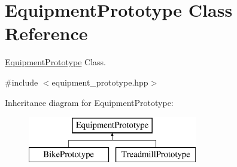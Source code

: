 \hypertarget{class_equipment_prototype}{}\section{Equipment\+Prototype Class Reference}
\label{class_equipment_prototype}


\hyperlink{class_equipment_prototype}{Equipment\+Prototype} Class.  




{\ttfamily \#include $<$equipment\+\_\+prototype.\+hpp$>$}

Inheritance diagram for Equipment\+Prototype\+:\begin{figure}[H]
\begin{center}
\leavevmode
\includegraphics[height=2.000000cm]{class_equipment_prototype}
\end{center}
\end{figure}
